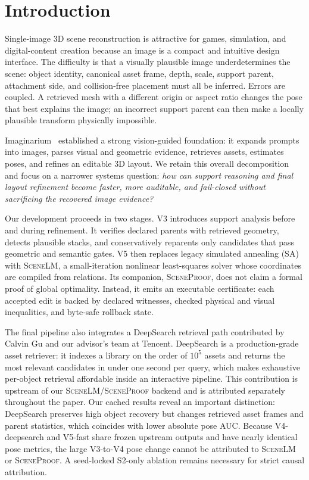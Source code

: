 \documentclass[10pt,twocolumn]{article}
\newcommand{\method}{\textsc{SceneLM}}
\newcommand{\proofsys}{\textsc{SceneProof}}
\begin{document}
\section{Introduction}

Single-image 3D scene reconstruction is attractive for games, simulation, and
digital-content creation because an image is a compact and intuitive design
interface.  The difficulty is that a visually plausible image underdetermines
the scene: object identity, canonical asset frame, depth, scale, support
parent, attachment side, and collision-free placement must all be inferred.
Errors are coupled.  A retrieved mesh with a different origin or aspect ratio
changes the pose that best explains the image; an incorrect support parent can
then make a locally plausible transform physically impossible.

Imaginarium~\cite{zhu2025imaginarium} established a strong vision-guided
foundation: it expands prompts into images, parses visual and geometric
evidence, retrieves assets, estimates poses, and refines an editable 3D
layout.  We retain this overall decomposition and focus on a narrower systems
question: \emph{how can support reasoning and final layout refinement become
faster, more auditable, and fail-closed without sacrificing the recovered
image evidence?}

Our development proceeds in two stages.  V3 introduces support analysis before
and during refinement.  It verifies declared parents with retrieved geometry,
detects plausible stacks, and conservatively reparents only candidates that
pass geometric and semantic gates.  V5 then replaces legacy simulated
annealing (SA) with \method{}, a small-iteration nonlinear least-squares solver
whose coordinates are compiled from relations.  Its companion, \proofsys{},
does not claim a formal proof of global optimality.  Instead, it emits an
executable certificate: each accepted edit is backed by declared witnesses,
checked physical and visual inequalities, and byte-safe rollback state.

The final pipeline also integrates a DeepSearch retrieval path contributed by
Calvin Gu and our advisor's team at Tencent.  DeepSearch is a production-grade
asset retriever: it indexes a library on the order of $10^5$ assets and returns
the most relevant candidates in under one second per query, which makes
exhaustive per-object retrieval affordable inside an interactive pipeline.  This
contribution is upstream of our \method{}/\proofsys{} backend and is attributed
separately throughout the paper.
Our cached results reveal an important distinction: DeepSearch preserves high
object recovery but changes retrieved asset frames and parent statistics,
which coincides with lower absolute pose AUC.  Because V4-deepsearch and
V5-fast share frozen upstream outputs and have nearly identical pose metrics,
the large V3-to-V4 pose change cannot be attributed to \method{} or
\proofsys{}.  A seed-locked S2-only ablation remains necessary for strict
causal attribution.
\end{document}

